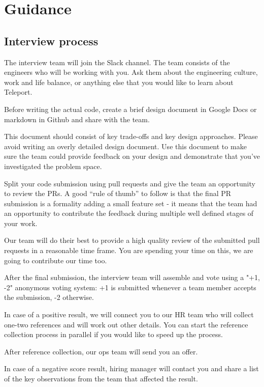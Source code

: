 \documentclass{article}
\begin{document}
\section{Guidance}

\subsection{Interview process}

The interview team will join the Slack channel. The team consists of the engineers who will be working with you.
Ask them about the engineering culture, work and life balance, or anything else that you would like to learn about Teleport.
  
Before writing the actual code, create a brief design document in Google Docs or markdown in Github and share with the team.

This document should consist of key trade-offs and key design approaches. Please avoid writing an overly detailed design document. Use this document to make sure the team could provide feedback on your design and demonstrate that you've investigated the problem space.

Split your code submission using pull requests and give the team an opportunity to review the PRs. A good “rule of thumb” to follow is that the final PR submission is a formality adding a small feature set - it means that the team had an opportunity to contribute the feedback during multiple well defined stages of your work.

Our team will do their best to provide a high quality review of the submitted pull requests in a reasonable time frame. You are spending your time on this, we are going to contribute our time too.

After the final submission, the interview team will assemble and vote using a "+1, -2" anonymous voting system: +1 is submitted whenever a team member accepts the submission, -2 otherwise.

In case of a positive result, we will connect you to our HR team who will collect one-two references and will work out other details. You can start the reference collection process in parallel if you would like to speed up the process.

After reference collection, our ops team will send you an offer.

In case of a negative score result, hiring manager will contact you and share a list of the key observations from the team that affected the result.
\end{document}
